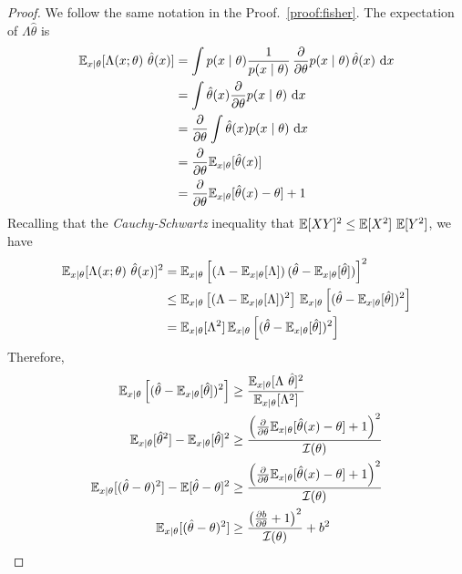 \begin{proof} 
We follow the same notation in the Proof.~\ref{proof:fisher}.
The expectation of $\Lambda \hat{\theta}$ is
\begin{align}
	\mathbb{E}_{x\mid \theta}[\Lambda(x;\theta)\ \hat{\theta}(x)] &= \int p(x\mid \theta) \frac{1}{p(x\mid \theta)}\, \frac{\partial}{\partial \theta} p(x\mid \theta)\, \hat{\theta}(x) \ \mathrm{d}x \\
	&= \int \hat{\theta}(x) \frac{\partial}{\partial \theta} p(x\mid \theta) \ \mathrm{d}x \\
	&= \frac{\partial}{\partial \theta} \int \hat{\theta}(x) p(x\mid \theta) \ \mathrm{d}x \\
	&= \frac{\partial}{\partial \theta} \mathbb{E}_{x\mid\theta}[\hat{\theta}(x)] \\
	&= \frac{\partial}{\partial \theta} \mathbb{E}_{x\mid\theta}[\hat{\theta}(x) - \theta] + 1
	\end{align}
Recalling that the \textit{Cauchy-Schwartz} inequality that $\EE[XY]^2 \leq \EE[X^2]\ \EE[Y^2] $, we have
\begin{align}
	\mathbb{E}_{x\mid \theta}[\Lambda(x;\theta)\ \hat{\theta}(x)]^2 &= \mathbb{E}_{x\mid \theta}\left[(\Lambda - \mathbb{E}_{x\mid \theta}[\Lambda]) \, (\hat{\theta} - \mathbb{E}_{x\mid \theta}[\hat{\theta}])\right]^2 \\
	&\leq  \mathbb{E}_{x\mid \theta}\left[(\Lambda - \mathbb{E}_{x\mid \theta}[\Lambda])^2\right] \, \mathbb{E}_{x\mid \theta}\left[(\hat{\theta} - \mathbb{E}_{x\mid \theta}[\hat{\theta}])^2\right] \\
	&=\mathbb{E}_{x\mid \theta}[\Lambda^2]\, \mathbb{E}_{x\mid \theta}\left[(\hat{\theta} - \mathbb{E}_{x\mid \theta}[\hat{\theta}])^2\right]
\end{align}
Therefore, 
\begin{align}
	\mathbb{E}_{x\mid \theta}\left[(\hat{\theta} - \mathbb{E}_{x\mid \theta}[\hat{\theta}])^2\right] &\geq \frac{\mathbb{E}_{x\mid \theta}[\Lambda\ \hat{\theta}]^2}{\mathbb{E}_{x\mid \theta}[\Lambda^2]} \\
	\mathbb{E}_{x\mid \theta}[\hat{\theta}^2] - \mathbb{E}_{x\mid \theta}[\hat{\theta}]^2 & \geq \frac{\left(\frac{\partial}{\partial \theta} \mathbb{E}_{x\mid\theta}[\hat{\theta}(x) - \theta] + 1\right)^2}{\mathcal{I}(\theta)} \\
	\mathbb{E}_{x\mid \theta}[(\hat{\theta}-\theta)^2] - \mathbb{E}[\hat{\theta} - \theta]^2 & \geq \frac{\left(\frac{\partial}{\partial \theta} \mathbb{E}_{x\mid\theta}[\hat{\theta}(x) - \theta] + 1\right)^2}{\mathcal{I}(\theta)} \\
	\mathbb{E}_{x\mid \theta}[(\hat{\theta}-\theta)^2] & \geq \frac{\left(\frac{\partial b}{\partial \theta} + 1\right)^2}{\mathcal{I}(\theta)}	+ b^2
\end{align}
\end{proof}

